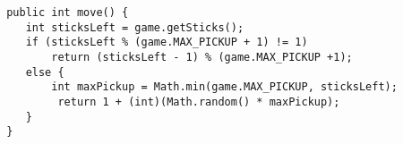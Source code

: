 \begin{ANS}
\begin{jjjlisting}
\begin{lstlisting}
 public int move() {   
    int sticksLeft = game.getSticks();
    if (sticksLeft % (game.MAX_PICKUP + 1) != 1)
        return (sticksLeft - 1) % (game.MAX_PICKUP +1);
    else {
        int maxPickup = Math.min(game.MAX_PICKUP, sticksLeft);
         return 1 + (int)(Math.random() * maxPickup);
    }
 }
\end{lstlisting}
\end{jjjlisting}

\end{ANS}

